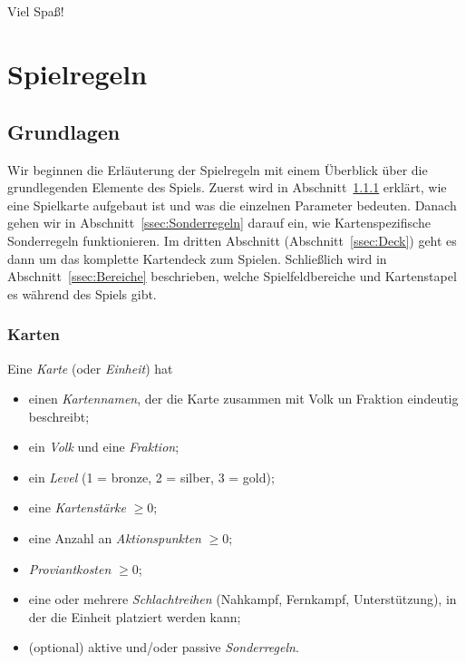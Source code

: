 \documentclass[a4paper,11pt]{report}
\newcommand{\sref}[1]{Abschnitt~\ref{#1}}
\begin{document}
\paragraph{}
Viel Spaß!

\chapter{Spielregeln}\label{ch:rules}
\section{Grundlagen}
Wir beginnen die Erläuterung der Spielregeln mit einem Überblick über die grundlegenden Elemente des Spiels. Zuerst wird in \sref{ssec:Karten} erklärt, wie eine Spielkarte aufgebaut ist und was die einzelnen Parameter bedeuten. Danach gehen wir in \sref{ssec:Sonderregeln} darauf ein, wie Kartenspezifische Sonderregeln funktionieren. Im dritten Abschnitt (\sref{ssec:Deck}) geht es dann um das komplette Kartendeck zum Spielen. Schließlich wird in \sref{ssec:Bereiche} beschrieben, welche Spielfeldbereiche und Kartenstapel es während des Spiels gibt.

\subsection{Karten}\label{ssec:Karten}
Eine \emph{Karte} (oder \emph{Einheit}) hat
\begin{itemize}
	\item einen \emph{Kartennamen}, der die Karte zusammen mit Volk un Fraktion eindeutig beschreibt;
	\item ein \emph{Volk} und eine \emph{Fraktion};%
	\item ein \emph{Level} (1 = bronze, 2 = silber, 3 = gold);%
	\item eine \emph{Kartenstärke} $\geq 0$;
	\item eine Anzahl an \emph{Aktionspunkten} $\geq 0$;
	\item \emph{Proviantkosten} $\geq 0$;
	\item eine oder mehrere \emph{Schlachtreihen} (Nahkampf, Fernkampf, Unterstützung), in der die Einheit platziert werden kann;
	\item (optional) aktive und/oder passive \emph{Sonderregeln}.
\end{itemize}
\end{document}

